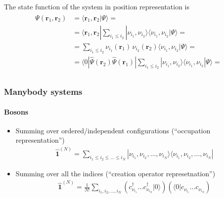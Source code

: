 \documentclass[letterpaper,10pt,english]{jupyterBook}
\begin{document}
The state function of the system in position representation is
\begin{equation*}
\begin{split}\begin{aligned}
  \Psi(\mathbf{r}_1, \mathbf{r}_2) 
  & = \langle \mathbf{r}_1 , \mathbf{r}_2 | \Psi \rangle = \\
  & = \langle \mathbf{r}_1 , \mathbf{r}_2 | \sum_{i_1 \le i_2} | \nu_{i_1}, \nu_{i_2} \rangle \langle \nu_{i_1}, \nu_{i_2} | \Psi \rangle = \\
  & = \sum_{i_1 \le i_2} \nu_{i_1}(\mathbf{r}_1) \, \nu_{i_2}(\mathbf{r}_2) \langle \nu_{i_1}, \nu_{i_2} | \Psi \rangle = \\
  & = \langle 0 | \hat{\Psi}(\mathbf{r}_2) \hat{\Psi}(\mathbf{r}_1) | \sum_{i_1 \le i_2} | \nu_{i_1}, \nu_{i_2} \rangle \langle \nu_{i_1}, \nu_{i_2} | \Psi \rangle = \\
\end{aligned}\end{split}
\end{equation*}
\sphinxAtStartPar
{}


\subsubsection{Many\sphinxhyphen{}body systems}
\label{\detokenize{ch/quantum-mechanics/many-body/quantum-fields:many-body-systems}}

\paragraph{Bosons}
\label{\detokenize{ch/quantum-mechanics/many-body/quantum-fields:id1}}
\sphinxAtStartPar
{}
\begin{itemize}
\item {} 
\sphinxAtStartPar
Summing over ordered/independent configurations (“occupation representation”)
\begin{equation*}
\begin{split}\hat{\mathbf{1}}^{(N)} = \sum_{i_1 \le i_2 \le \dots \le i_N} | \nu_{i_1}, \nu_{i_2}, \dots, \nu_{i_N} \rangle \langle \nu_{i_1}, \nu_{i_2}, \dots, \nu_{i_N} |\end{split}
\end{equation*}
\item {} 
\sphinxAtStartPar
Summing over all the indices (“creation operator represetnation”)
\begin{equation*}
\begin{split}\hat{\mathbf{1}}^{(N)} = \frac{1}{N!} \sum_{i_1, i_2, \dots, i_N} \left( c_{\nu_{i_1}}^{\dagger} \dots c_{\nu_{i_N}}^{\dagger} | 0 \rangle \right) \left( \langle 0 | c_{\nu_{i_1}} \dots c_{\nu_{i_N}} \right)\end{split}
\end{equation*}
\end{itemize}
\end{document}
